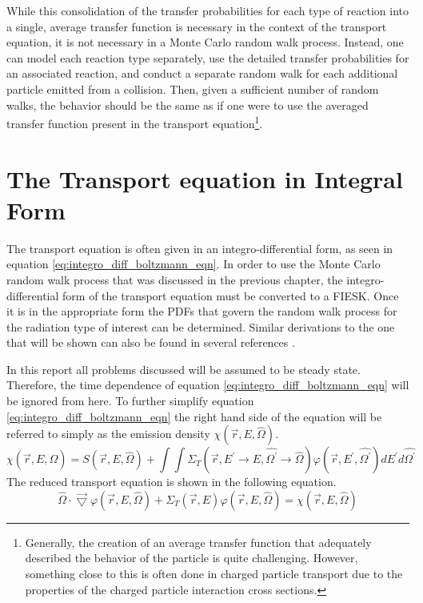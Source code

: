 While this consolidation of the transfer probabilities for each type of 
reaction into a single, average transfer function is necessary in the context 
of the transport equation, it is not necessary in a Monte Carlo random walk 
process. Instead, one can model each reaction type separately, use the 
detailed transfer probabilities for an associated reaction, and conduct 
a separate random walk for each additional particle emitted from a collision. 
Then, given a sufficient number of random walks, the behavior should be the 
same as if one were to use the averaged transfer function present in the 
transport equation\footnote{Generally, the creation of an average transfer
function that adequately described the behavior of the particle is quite
challenging. However, something close to this is often done in charged particle
transport due to the properties of the charged particle interaction cross
sections.}.

\section{The Transport equation in Integral Form}
The transport equation is often given in an integro-differential form, as seen 
in equation \ref{eq:integro_diff_boltzmann_eqn}. In order to use the Monte 
Carlo random walk process that was discussed in the previous chapter, the 
integro-differential form of the transport equation must be converted to a 
FIESK. Once it is in the appropriate form the PDFs that govern the random walk 
process for the radiation type of interest can be determined. Similar 
derivations to the one that will be shown can also be found in several 
references \citep{lewis_computational_1993, hoogenboom_adjoint_1977, irving_adjoint_1971, bell_nuclear_1979}.
 
In this report all problems discussed will be assumed to be steady state. 
Therefore, the time dependence of equation \ref{eq:integro_diff_boltzmann_eqn} 
will be ignored from here. To further simplify equation 
\ref{eq:integro_diff_boltzmann_eqn} the right hand side of the equation will be 
referred to simply as the emission density $\chi(\vec{r},E,\hat{\Omega})$.
\begin{equation}
    \chi(\vec{r},E,\hat{\Omega}) = S(\vec{r},E,\hat{\Omega}) +
    \int\int \Sigma_T(\vec{r},E^{'} \to E,\hat{\Omega^{'}} \to \hat{\Omega})
    \varphi(\vec{r},E^{'},\hat{\Omega^{'}}) dE^{'}d\hat{\Omega^{'}}
  \label{eq:emission_density}
\end{equation}
The reduced transport equation is shown in the following equation.
\begin{equation}
  \hat{\Omega} \cdot \vec{\bigtriangledown} \varphi(\vec{r},E,\hat{\Omega})
  + \Sigma_T(\vec{r},E) \varphi(\vec{r},E,\hat{\Omega}) =  
 \chi(\vec{r},E,\hat{\Omega})
  \label{eq:reduced_transport_eqn}
\end{equation}

